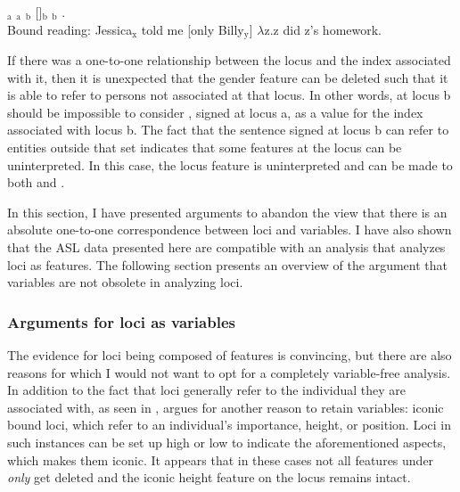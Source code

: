 \documentclass[output=paper,
modfonts
]{langscibook}
\begin{document}
\begin{exe} 
	\ex {}$_\text{a}$ $_\text{a}$  $_\text{b}$ []$_\text{b}$ $_\text{b}$ .\\
	Bound reading: Jessica$_\text{x}$ told me [only Billy$_\text{y}$] \(\lambda\)z.z did z’s homework. \citep[9]{Kuhn2015}
\end{exe}

If there was a one-to-one relationship between the locus and the index associated with it, then it is unexpected that the gender feature can be deleted such that it is able to refer to persons not associated at that locus. In other words,  at locus b should be impossible to consider , signed at locus a, as a value for the index associated with locus b. The fact that the sentence signed at locus b can refer to entities outside that set indicates that some features at the locus can be uninterpreted. In this case, the locus feature is uninterpreted and  can be made to both  and . 

In this section, I have presented arguments to abandon the view that there is an absolute one-to-one correspondence between loci and variables. I have also shown that the ASL data presented here are compatible with an analysis that analyzes loci as features. The following section presents an overview of the argument that variables are not obsolete in analyzing loci. 

\subsubsection{Arguments for loci as variables}

The evidence for loci being composed of features is convincing, but there are also reasons for which I would not want to opt for a completely variable-free analysis. In addition to the fact that loci generally refer to the individual they are associated with, as seen in , \citet{Schlenker2014} argues for another reason to retain variables: iconic bound loci, which refer to an individual's importance, height, or position. Loci in such instances can be set up high or low to indicate the aforementioned aspects, which makes them iconic. It appears that in these cases not all features under \textit{only} get deleted and the iconic height feature on the locus remains intact. 
\end{document}
